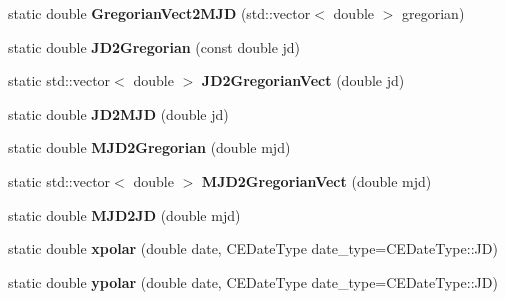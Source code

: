 \begin{DoxyCompactItemize}
\item 
\hypertarget{class_c_e_date_a527a939f24d47becef7fdeaf1f51bcd9}{}static double {\bfseries Gregorian\+Vect2\+M\+J\+D} (std\+::vector$<$ double $>$ gregorian)\label{class_c_e_date_a527a939f24d47becef7fdeaf1f51bcd9}

\item 
\hypertarget{class_c_e_date_af699560be178f1ffbf9f9aae444085ad}{}static double {\bfseries J\+D2\+Gregorian} (const double jd)\label{class_c_e_date_af699560be178f1ffbf9f9aae444085ad}

\item 
\hypertarget{class_c_e_date_a4dbfe2ea3d5083c90602baa2b3003587}{}static std\+::vector$<$ double $>$ {\bfseries J\+D2\+Gregorian\+Vect} (double jd)\label{class_c_e_date_a4dbfe2ea3d5083c90602baa2b3003587}

\item 
\hypertarget{class_c_e_date_a2f8aa5a0023c485407ce172c167d970d}{}static double {\bfseries J\+D2\+M\+J\+D} (double jd)\label{class_c_e_date_a2f8aa5a0023c485407ce172c167d970d}

\item 
\hypertarget{class_c_e_date_a3c33bc8e95c975087dab29645839794c}{}static double {\bfseries M\+J\+D2\+Gregorian} (double mjd)\label{class_c_e_date_a3c33bc8e95c975087dab29645839794c}

\item 
\hypertarget{class_c_e_date_a6e0489eaa084ffa934f2a661929e74cf}{}static std\+::vector$<$ double $>$ {\bfseries M\+J\+D2\+Gregorian\+Vect} (double mjd)\label{class_c_e_date_a6e0489eaa084ffa934f2a661929e74cf}

\item 
\hypertarget{class_c_e_date_ad5610b1c2d2891dff856f5be07801272}{}static double {\bfseries M\+J\+D2\+J\+D} (double mjd)\label{class_c_e_date_ad5610b1c2d2891dff856f5be07801272}

\item 
\hypertarget{class_c_e_date_ace399234c2715e61518393497511b293}{}static double {\bfseries xpolar} (double date, C\+E\+Date\+Type date\+\_\+type=C\+E\+Date\+Type\+::\+J\+D)\label{class_c_e_date_ace399234c2715e61518393497511b293}

\item 
\hypertarget{class_c_e_date_a013d72a2273b76be18978a79c4d96166}{}static double {\bfseries ypolar} (double date, C\+E\+Date\+Type date\+\_\+type=C\+E\+Date\+Type\+::\+J\+D)\label{class_c_e_date_a013d72a2273b76be18978a79c4d96166}

\end{DoxyCompactItemize}
